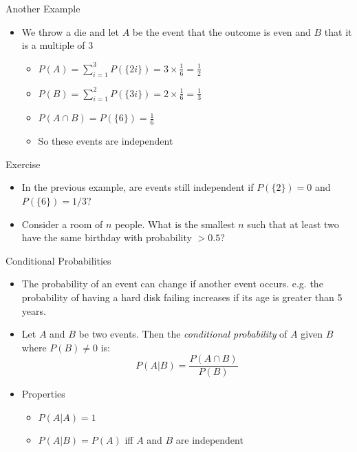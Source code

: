 \documentclass{beamer}
\begin{document}
\begin{frame}{Another Example}  
 \begin{itemize}
  \item We throw a die and let $A$ be the event that the outcome is even and $B$ that it is a multiple of 3
\begin{itemize}
\item $P(A) = \sum_{i=1}^3 P(\{2i\}) = 3 \times \frac{1}{6} = \frac{1}{2}$ 
\item $P(B) = \sum_{i=1}^2 P(\{3i\}) = 2 \times \frac{1}{6} = \frac{1}{3}$ 
\item $P(A \cap B) = P(\{6\}) = \frac{1}{6}$ 
\item So these events are independent 
 \end{itemize}
 \end{itemize}
\end{frame}


\begin{frame}{Exercise}
\begin{itemize} 
 \item In the previous example, are events still independent if $P(\{2\}) = 0$ and $P(\{6\}) = 1/3$? 
 \item Consider a room of $n$ people. What is the smallest $n$ such that at least two have the same birthday with probability $> 0.5$? 
\end{itemize}
\end{frame}

\begin{frame}{Conditional Probabilities}
\begin{itemize} 
 \item The probability of an event can change if another event occurs. e.g. the probability of having a hard disk failing increases if its age is greater than 5 years. 
\item Let $A$ and $B$ be two events. Then the \emph{conditional probability} of $A$ given $B$ where $P(B) \neq 0$ is: 
\begin{displaymath} 
 P(A | B) = \frac{P(A \cap B)}{P(B)}
\end{displaymath}
\item Properties 
\begin{itemize}
\item $P(A | A) = 1$
\item $P(A | B) = P(A)$ iff $A$ and $B$ are independent 
\end{itemize}
\end{itemize} 
\end{frame}
\end{document}
